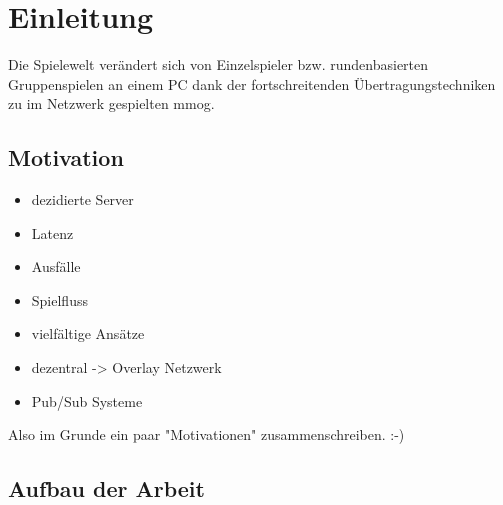 \chapter{Einleitung}
\label{chap:einleitung}

Die Spielewelt verändert sich von Einzelspieler bzw. rundenbasierten Gruppenspielen an einem PC dank der fortschreitenden Übertragungstechniken zu im Netzwerk gespielten \ac{mmog}.

\cite{Triebel2008Peertopeer} %

\section{Motivation}
\begin{itemize}
\item dezidierte Server
\item Latenz
\item Ausfälle
\item Spielfluss
\end{itemize}

\begin{itemize}
\item vielfältige Ansätze \cite{Bharambe2008Donnybrook} %
\item dezentral -> Overlay Netzwerk
\item Pub/Sub Systeme \cite{Knutsson2004Peertopeer} %
\end{itemize}

Also im Grunde ein paar "Motivationen" zusammenschreiben. :-)

\section{Aufbau der Arbeit}
